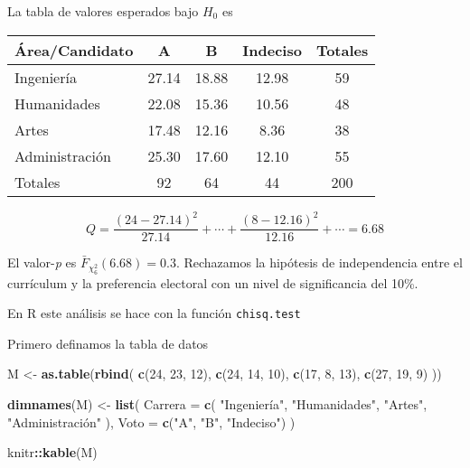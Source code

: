 \documentclass[
  12pt,
]{book}
\newenvironment{Shaded}{\begin{snugshade}}{\end{snugshade}}
\newcommand{\DataTypeTok}[1]{\textcolor[rgb]{0.13,0.29,0.53}{#1}}
\newcommand{\DecValTok}[1]{\textcolor[rgb]{0.00,0.00,0.81}{#1}}
\newcommand{\KeywordTok}[1]{\textcolor[rgb]{0.13,0.29,0.53}{\textbf{#1}}}
\newcommand{\NormalTok}[1]{#1}
\newcommand{\OperatorTok}[1]{\textcolor[rgb]{0.81,0.36,0.00}{\textbf{#1}}}
\newcommand{\StringTok}[1]{\textcolor[rgb]{0.31,0.60,0.02}{#1}}
\begin{document}
La tabla de valores esperados bajo \(H_0\) es

\begin{longtable}[]{@{}lcccc@{}}
\toprule
Área/Candidato & A & B & Indeciso & Totales\tabularnewline
\midrule
\endhead
Ingeniería & 27.14 & 18.88 & 12.98 & 59\tabularnewline
Humanidades & 22.08 & 15.36 & 10.56 & 48\tabularnewline
Artes & 17.48 & 12.16 & 8.36 & 38\tabularnewline
Administración & 25.30 & 17.60 & 12.10 & 55\tabularnewline
Totales & 92 & 64 & 44 & 200\tabularnewline
\bottomrule
\end{longtable}

\[Q = \dfrac{(24-27.14)^2}{27.14} + \cdots+\dfrac{(8-12.16)^2}{12.16}+\cdots =
6.68\]

El valor-\emph{p} es \(\bar F_{\chi^2_6}(6.68) = 0.3\). Rechazamos la hipótesis de
independencia entre el currículum y la preferencia electoral con un nivel de
significancia del 10\%.

En R este análisis se hace con la función \texttt{chisq.test}

Primero definamos la tabla de datos

\begin{Shaded}
\begin{Highlighting}[]
\NormalTok{M \textless{}{-}}\StringTok{ }\KeywordTok{as.table}\NormalTok{(}\KeywordTok{rbind}\NormalTok{(}
  \KeywordTok{c}\NormalTok{(}\DecValTok{24}\NormalTok{, }\DecValTok{23}\NormalTok{, }\DecValTok{12}\NormalTok{),}
  \KeywordTok{c}\NormalTok{(}\DecValTok{24}\NormalTok{, }\DecValTok{14}\NormalTok{, }\DecValTok{10}\NormalTok{),}
  \KeywordTok{c}\NormalTok{(}\DecValTok{17}\NormalTok{, }\DecValTok{8}\NormalTok{, }\DecValTok{13}\NormalTok{),}
  \KeywordTok{c}\NormalTok{(}\DecValTok{27}\NormalTok{, }\DecValTok{19}\NormalTok{, }\DecValTok{9}\NormalTok{)}
\NormalTok{))}

\KeywordTok{dimnames}\NormalTok{(M) \textless{}{-}}\StringTok{ }\KeywordTok{list}\NormalTok{(}
  \DataTypeTok{Carrera =} \KeywordTok{c}\NormalTok{(}
    \StringTok{"Ingeniería"}\NormalTok{,}
    \StringTok{"Humanidades"}\NormalTok{,}
    \StringTok{"Artes"}\NormalTok{,}
    \StringTok{"Administración"}
\NormalTok{  ),}
  \DataTypeTok{Voto =} \KeywordTok{c}\NormalTok{(}\StringTok{"A"}\NormalTok{, }\StringTok{"B"}\NormalTok{, }\StringTok{"Indeciso"}\NormalTok{)}
\NormalTok{)}

\NormalTok{knitr}\OperatorTok{::}\KeywordTok{kable}\NormalTok{(M)}
\end{Highlighting}
\end{Shaded}
\end{document}
